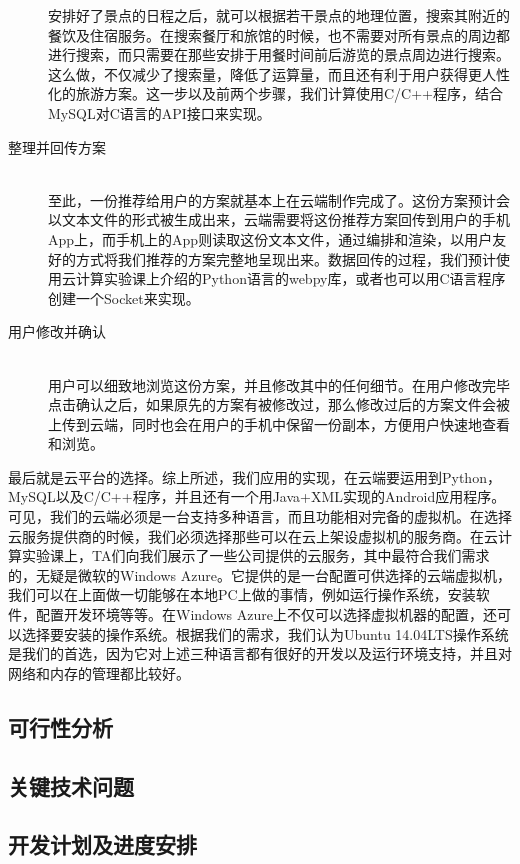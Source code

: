 \documentclass[12pt,a4paper]{article}
\begin{document}
\begin{CJK}{UTF8}{gbsn}
\begin{description}
	安排好了景点的日程之后，就可以根据若干景点的地理位置，搜索其附近的餐饮及住宿服务。在搜索餐厅和旅馆的时候，也不需要对所有景点的周边都进行搜索，而只需要在那些安排于用餐时间前后游览的景点周边进行搜索。这么做，不仅减少了搜索量，降低了运算量，而且还有利于用户获得更人性化的旅游方案。这一步以及前两个步骤，我们计算使用C{\slash}C++程序，结合MySQL对C语言的API接口来实现。
	\item[整理并回传方案] \hfill \\
	至此，一份推荐给用户的方案就基本上在云端制作完成了。这份方案预计会以文本文件的形式被生成出来，云端需要将这份推荐方案回传到用户的手机App上，而手机上的App则读取这份文本文件，通过编排和渲染，以用户友好的方式将我们推荐的方案完整地呈现出来。数据回传的过程，我们预计使用云计算实验课上介绍的Python语言的webpy库，或者也可以用C语言程序创建一个Socket来实现。
	\item[用户修改并确认] \hfill \\
	用户可以细致地浏览这份方案，并且修改其中的任何细节。在用户修改完毕点击确认之后，如果原先的方案有被修改过，那么修改过后的方案文件会被上传到云端，同时也会在用户的手机中保留一份副本，方便用户快速地查看和浏览。
	\end{description}

	最后就是云平台的选择。综上所述，我们应用的实现，在云端要运用到Python，MySQL以及C{\slash}C++程序，并且还有一个用Java+XML实现的Android应用程序。可见，我们的云端必须是一台支持多种语言，而且功能相对完备的虚拟机。在选择云服务提供商的时候，我们必须选择那些可以在云上架设虚拟机的服务商。在云计算实验课上，TA们向我们展示了一些公司提供的云服务，其中最符合我们需求的，无疑是微软的Windows Azure。它提供的是一台配置可供选择的云端虚拟机，我们可以在上面做一切能够在本地PC上做的事情，例如运行操作系统，安装软件，配置开发环境等等。在Windows Azure上不仅可以选择虚拟机器的配置，还可以选择要安装的操作系统。根据我们的需求，我们认为Ubuntu 14.04LTS操作系统是我们的首选，因为它对上述三种语言都有很好的开发以及运行环境支持，并且对网络和内存的管理都比较好。
	
	\subsection{可行性分析}

	\subsection{关键技术问题}

	\subsection{开发计划及进度安排}



\end{CJK}
\end{document}
